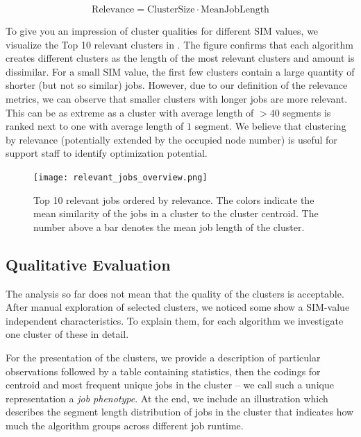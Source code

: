 \documentclass{jhps}
\begin{document}
\begin{equation}
\text{Relevance} = \text{ClusterSize} \cdot \text{MeanJobLength}
\label{eq:rel}
\end{equation}

To give you an impression of cluster qualities for different SIM values, we visualize the Top 10 relevant clusters in .
The figure confirms that each algorithm creates different clusters as the length of the most relevant clusters and amount is dissimilar.
For a small SIM value, the first few clusters contain a large quantity of shorter (but not so similar) jobs.
However, due to our definition of the relevance metrics, we can observe that smaller clusters with longer jobs are more relevant.
This can be as extreme as a cluster with average length of $>40$ segments is ranked next to one with average length of $1$ segment.
We believe that clustering by relevance (potentially extended by the occupied node number) is useful for support staff to identify optimization potential.

\begin{figure}
  \centering
  \texttt{[image: relevant\_jobs\_overview.png]}
   \caption{Top 10 relevant jobs ordered by relevance.
   The colors indicate the mean similarity of the jobs in a cluster to the cluster centroid.
   The number above a bar denotes the mean job length of the cluster.}
   \label{fig:top10_relevant_jobs}
\end{figure}

\subsection{Qualitative Evaluation}
The analysis so far does not mean that the quality of the clusters is acceptable.
After manual exploration of selected clusters, we noticed some show a SIM-value independent characteristics.
To explain them, for each algorithm we investigate one cluster of these in detail.

For the presentation of the clusters, we provide a description of particular observations followed by a table containing statistics, then the codings for centroid and most frequent unique jobs in the cluster -- we call such a unique representation a \textit{job phenotype}.
At the end, we include an illustration which describes the segment length distribution of jobs in the cluster that indicates how much the algorithm groups across different job runtime.
\end{document}
